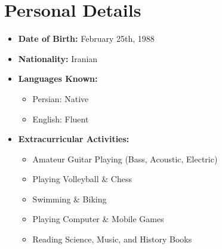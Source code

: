 \documentclass{cv}
\begin{document}

\section{Personal Details}

\begin{itemize}

\item
\textbf{Date of Birth:}
February 25th, 1988


\item
{\bf Nationality:}
Iranian

\item
\textbf{Languages Known:}
\begin{itemize}

\item
Persian: Native

\item
English: Fluent
%
\end{itemize}

\item
\textbf{Extracurricular Activities:}

\begin{itemize}
\item
Amateur Guitar Playing (Bass, Acoustic, Electric)
\item
Playing Volleyball \& Chess
\item
Swimming \& Biking
\item
Playing Computer \& Mobile Games
\item
Reading Science, Music, and History Books
\end{itemize} 


\end{itemize}

\end{document}
